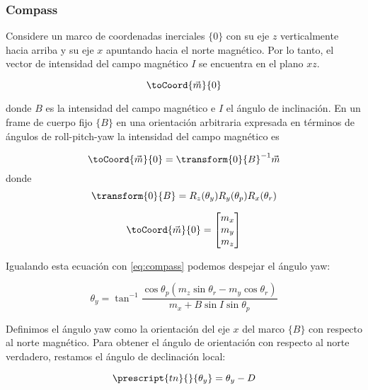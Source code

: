 \begin{frame}
    \frametitle{Compass}
    \footnotesize
    Considere un marco de coordenadas inerciales $\{ 0 \}$ con su eje $z$ verticalmente hacia arriba y su eje $x$ apuntando hacia el norte magnético. Por lo tanto, el vector de intensidad del campo magnético $I$ se encuentra en el plano $xz$.

    \begin{equation*}
        \toCoord{\vec{m}}{0}
    \end{equation*}

    donde $B$ es la intensidad del campo magnético e $I$ el ángulo de inclinación. En un frame de cuerpo fijo $\{ B \}$ en una orientación arbitraria expresada en términos de ángulos de roll-pitch-yaw la intensidad del campo magnético es

    \begin{equation}
        \label{eq:compass}
        \toCoord{\vec{m}}{0} = \transform{0}{B}^{-1} \vec{m}
    \end{equation}
    donde
    \begin{equation*}
        \transform{0}{B} = R_{z}(\theta_{y}) R_{y}(\theta_{p}) R_{x}(\theta_{r})
    \end{equation*}

    \begin{equation*}
    \toCoord{\vec{m}}{0} =
    \begin{bmatrix}
        m_{x} \\
        m_{y} \\
        m_{z}
    \end{bmatrix}
    \end{equation*}

    Igualando esta ecuación con \ref{eq:compass} podemos despejar el ángulo yaw:

    \begin{equation*}
        \theta_{y} = \tan^{-1} \dfrac{\cos \theta_{p}  \left( m_{z} \sin \theta_{r} - m_{y} \cos \theta_{r} \right)} {m_{x} + B \sin I \sin \theta_{p}}
    \end{equation*}

    Definimos el ángulo yaw como la orientación del eje $x$ del marco $\{ B \}$ con respecto al norte magnético. Para obtener el ángulo de orientación con respecto al norte verdadero, restamos el ángulo de declinación local:

    \begin{equation*}
        \prescript{tn}{}{\theta_{y}} = \theta_{y} - D
    \end{equation*}

\end{frame}
